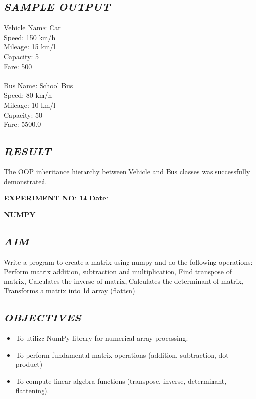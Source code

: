 \documentclass[11pt,a4paper]{article}
\begin{document}
\subsection*{\textit{SAMPLE OUTPUT}}
\begin{tcolorbox}[colback=black!85,colframe=navyblue,title=\textbf{Terminal Output},coltitle=white,fonttitle=\bfseries\small]
\small\ttfamily\color{green!30!white}
Vehicle Name: Car\\
Speed: 150 km/h\\
Mileage: 15 km/l\\
Capacity: 5\\
Fare: 500\\
\\
Bus Name: School Bus\\
Speed: 80 km/h\\
Mileage: 10 km/l\\
Capacity: 50\\
Fare: 5500.0
\end{tcolorbox}

\subsection*{\textit{RESULT}}
The OOP inheritance hierarchy between Vehicle and Bus classes was successfully demonstrated.

\newpage

\noindent
\textbf{\large EXPERIMENT NO: 14} \hfill \textbf{\large Date: \underline{\hspace{3cm}}}

\vspace{0.2cm}
\begin{center}
{\Huge \textbf{\textcolor{navyblue}{NUMPY}}}
\end{center}
\vspace{0.3cm}

\subsection*{\textit{AIM}}
Write a program to create a matrix using numpy and do the following operations: Perform matrix addition, subtraction and multiplication, Find transpose of matrix, Calculates the inverse of matrix, Calculates the determinant of matrix, Transforms a matrix into 1d array (flatten)

\subsection*{\textit{OBJECTIVES}}
\begin{itemize}
  \item To utilize NumPy library for numerical array processing.
  \item To perform fundamental matrix operations (addition, subtraction, dot product).
  \item To compute linear algebra functions (transpose, inverse, determinant, flattening).
\end{itemize}
\end{document}
